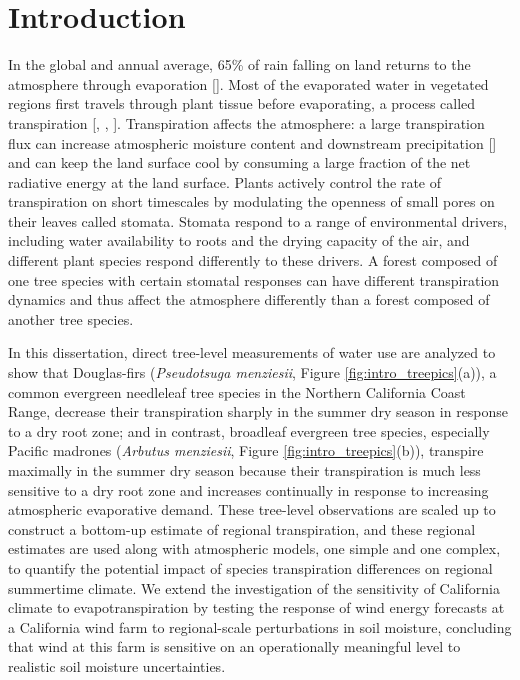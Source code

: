 \chapter{Introduction}
\label{c.intro}

In the global and annual average, 65\% of rain falling on land returns to the atmosphere through evaporation [\cite{trenberth2007}].  Most of the evaporated water in vegetated regions first travels through plant tissue before evaporating, a process called transpiration [\cite{wilson2001comparison}, \cite{dirmeyer2005second}, \cite{jasechko2013terrestrial}].  Transpiration affects the atmosphere: a large transpiration flux can increase atmospheric moisture content and downstream precipitation [\cite{ISI:A1996VD58700003}] and can keep the land surface cool by consuming a large fraction of the net radiative energy at the land surface.  Plants actively control the rate of transpiration on short timescales by modulating the openness of small pores on their leaves called stomata.  Stomata respond to a range of environmental drivers, including water availability to roots and the drying capacity of the air, and different plant species respond differently to these drivers.  A forest composed of one tree species with certain stomatal responses can have different transpiration dynamics and thus affect the atmosphere differently than a forest composed of another tree species.  

In this dissertation, direct tree-level measurements of water use are analyzed to show that Douglas-firs (\textit{Pseudotsuga menziesii}, Figure \ref{fig:intro_treepics}(a)), a common evergreen needleleaf tree species in the Northern California Coast Range, decrease their transpiration sharply in the summer dry season in response to a dry root zone; and in contrast, broadleaf evergreen tree species, especially Pacific madrones (\textit{Arbutus menziesii}, Figure \ref{fig:intro_treepics}(b)), transpire maximally in the summer dry season because their transpiration is much less sensitive to a dry root zone and increases continually in response to increasing atmospheric evaporative demand.  These tree-level observations are scaled up to construct a bottom-up estimate of regional transpiration, and these regional estimates are used along with atmospheric models, one simple and one complex, to quantify the potential impact of species transpiration differences on regional summertime climate.  We extend the investigation of the sensitivity of California climate to evapotranspiration by testing the response of wind energy forecasts at a California wind farm to regional-scale perturbations in soil moisture, concluding that wind at this farm is sensitive on an operationally meaningful level to realistic soil moisture uncertainties.

